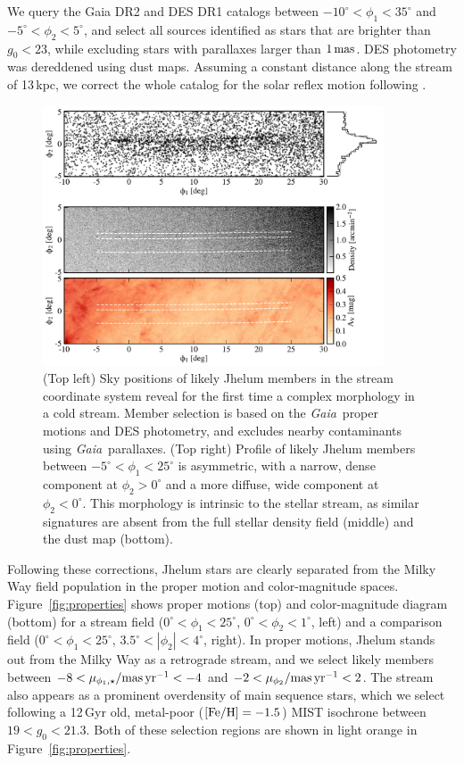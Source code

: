 \documentclass[twocolumn]{aastex62}
\newcommand{\gaia}{\textsl{Gaia}}
\begin{document}
We query the Gaia DR2 \citep{gdr2} and DES DR1 \citep{abbott2018} catalogs between $-10^\circ<\phi_1<35^\circ$ and $-5^\circ<\phi_2<5^\circ$, and select all sources identified as stars that are brighter than $g_0<23$, while excluding stars with parallaxes larger than $1\,\rm mas$.
DES photometry was dereddened using \citet{sfd} dust maps.
Assuming a constant distance along the stream of 13\,kpc, we correct the whole catalog for the solar reflex motion following \citet{pwb}.

\begin{figure}
\begin{center}
\includegraphics[width=0.9\textwidth]{map.pdf}
\end{center}
\caption{
(Top left) Sky positions of likely Jhelum members in the stream coordinate system reveal for the first time a complex morphology in a cold stream.
Member selection is based on the \gaia\ proper motions and DES photometry, and excludes nearby contaminants using \gaia\ parallaxes.
(Top right) Profile of likely Jhelum members between $-5^\circ<\phi_1<25^\circ$ is asymmetric, with a narrow, dense component at $\phi_2>0^\circ$ and a more diffuse, wide component at $\phi_2<0^\circ$.
This morphology is intrinsic to the stellar stream, as similar signatures are absent from the full stellar density field (middle) and the dust map (bottom).
}
\label{fig:map}
\end{figure}

Following these corrections, Jhelum stars are clearly separated from the Milky Way field population in the proper motion and color-magnitude spaces.
Figure~\ref{fig:properties} shows proper motions (top) and color-magnitude diagram (bottom) for a stream field ($0^\circ<\phi_1<25^\circ$, $0^\circ<\phi_2<1^\circ$, left) and a comparison field ($0^\circ<\phi_1<25^\circ$, $3.5^\circ<|\phi_2|<4^\circ$, right).
In proper motions, Jhelum stands out from the Milky Way as a retrograde stream, and we select likely members between $-8<\mu_{\phi_1,\star}/{\rm mas\,yr^{-1}}<-4$ and $-2<\mu_{\phi_2}/{\rm mas\,yr^{-1}}<2$.
The stream also appears as a prominent overdensity of main sequence stars, which we select following a 12\,Gyr old, metal-poor ($\rm[Fe/H]=-1.5$) MIST isochrone \citep{choi2016} between $19<g_0<21.3$.
Both of these selection regions are shown in light orange in Figure~\ref{fig:properties}.
\end{document}
